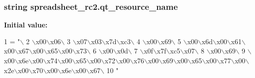\subsubsection[{qt\+\_\+resource\+\_\+name}]{\setlength{\rightskip}{0pt plus 5cm}string spreadsheet\+\_\+rc2.\+qt\+\_\+resource\+\_\+name}\label{namespacespreadsheet__rc2_a61a0e2698e21e25c55c3354b63c0c3e0}
{\bfseries Initial value\+:}
\begin{DoxyCode}
1 = \textcolor{stringliteral}{"\(\backslash\)}
2 \textcolor{stringliteral}{\(\backslash\)x00\(\backslash\)x06\(\backslash\)}
3 \textcolor{stringliteral}{\(\backslash\)x07\(\backslash\)x03\(\backslash\)x7d\(\backslash\)xc3\(\backslash\)}
4 \textcolor{stringliteral}{\(\backslash\)x00\(\backslash\)x69\(\backslash\)}
5 \textcolor{stringliteral}{\(\backslash\)x00\(\backslash\)x6d\(\backslash\)x00\(\backslash\)x61\(\backslash\)x00\(\backslash\)x67\(\backslash\)x00\(\backslash\)x65\(\backslash\)x00\(\backslash\)x73\(\backslash\)}
6 \textcolor{stringliteral}{\(\backslash\)x00\(\backslash\)x0d\(\backslash\)}
7 \textcolor{stringliteral}{\(\backslash\)x0f\(\backslash\)x7f\(\backslash\)xc5\(\backslash\)x07\(\backslash\)}
8 \textcolor{stringliteral}{\(\backslash\)x00\(\backslash\)x69\(\backslash\)}
9 \textcolor{stringliteral}{\(\backslash\)x00\(\backslash\)x6e\(\backslash\)x00\(\backslash\)x74\(\backslash\)x00\(\backslash\)x65\(\backslash\)x00\(\backslash\)x72\(\backslash\)x00\(\backslash\)x76\(\backslash\)x00\(\backslash\)x69\(\backslash\)x00\(\backslash\)x65\(\backslash\)x00\(\backslash\)x77\(\backslash\)x00\(\backslash\)x2e\(\backslash\)x00\(\backslash\)x70\(\backslash\)x00\(\backslash\)x6e\(\backslash\)x00\(\backslash\)x67\(\backslash\)}
10 \textcolor{stringliteral}{"}
\end{DoxyCode}
\hypertarget{namespacespreadsheet__rc2_a7d7ce22c6e2d32da03510320882c65ff}{}
